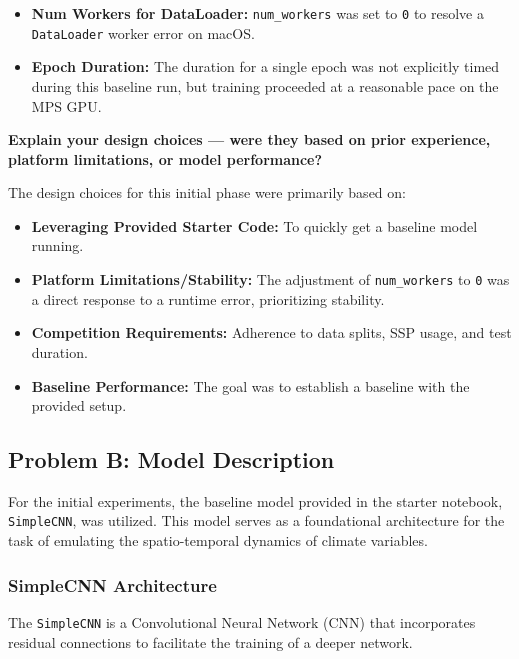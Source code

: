 \documentclass{article}
\begin{document}
\begin{itemize}
\begin{itemize}
        \item \textbf{Num Workers for DataLoader:} \texttt{num\_workers} was set to \texttt{0} to resolve a \texttt{DataLoader} worker error on macOS.
        \item \textbf{Epoch Duration:} The duration for a single epoch was not explicitly timed during this baseline run, but training proceeded at a reasonable pace on the MPS GPU. %
    \end{itemize}
\end{itemize}

\textbf{Explain your design choices --- were they based on prior experience, platform limitations, or model performance?}

The design choices for this initial phase were primarily based on:
\begin{itemize}
    \item \textbf{Leveraging Provided Starter Code:} To quickly get a baseline model running.
    \item \textbf{Platform Limitations/Stability:} The adjustment of \texttt{num\_workers} to \texttt{0} was a direct response to a runtime error, prioritizing stability.
    \item \textbf{Competition Requirements:} Adherence to data splits, SSP usage, and test duration.
    \item \textbf{Baseline Performance:} The goal was to establish a baseline with the provided setup.
\end{itemize}

\subsection{Problem B: Model Description}

For the initial experiments, the baseline model provided in the starter notebook, \texttt{SimpleCNN}, was utilized. This model serves as a foundational architecture for the task of emulating the spatio-temporal dynamics of climate variables.

\subsubsection{SimpleCNN Architecture}
The \texttt{SimpleCNN} is a Convolutional Neural Network (CNN) that incorporates residual connections to facilitate the training of a deeper network.
\end{document}
